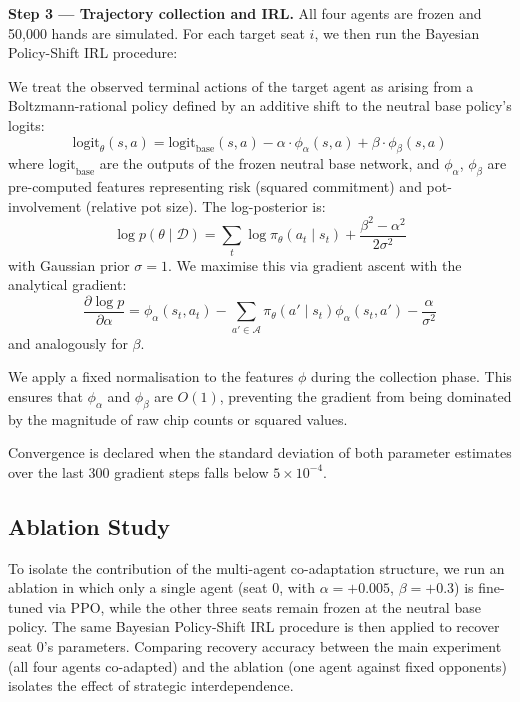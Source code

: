 \documentclass{article}
\begin{document}
\textbf{Step 3 --- Trajectory collection and IRL.} All four agents are frozen and 50,000 hands are simulated. For each target seat $i$, we then run the Bayesian Policy-Shift IRL procedure:
\begin{enumerate}
    We treat the observed terminal actions of the target agent as arising from a Boltzmann-rational policy defined by an additive shift to the neutral base policy's logits:
    \[
    \text{logit}_\theta(s, a) = \text{logit}_{\text{base}}(s, a) - \alpha \cdot \phi_\alpha(s, a) + \beta \cdot \phi_\beta(s, a)
    \]
    where $\text{logit}_{\text{base}}$ are the outputs of the frozen neutral base network, and $\phi_\alpha$, $\phi_\beta$ are pre-computed features representing risk (squared commitment) and pot-involvement (relative pot size). The log-posterior is:
    \[
    \log p(\theta \mid \mathcal{D}) = \sum_t \log \pi_\theta(a_t \mid s_t) + \frac{\beta^2 - \alpha^2}{2\sigma^2}
    \]
    with Gaussian prior $\sigma = 1$. We maximise this via gradient ascent with the analytical gradient:
    \[
    \frac{\partial \log p}{\partial \alpha} = \phi_\alpha(s_t, a_t) - \sum_{a' \in \mathcal{A}} \pi_\theta(a' \mid s_t) \phi_\alpha(s_t, a') - \frac{\alpha}{\sigma^2}
    \]
    and analogously for $\beta$.

    We apply a fixed normalisation to the features $\phi$ during the collection phase. This ensures that $\phi_\alpha$ and $\phi_\beta$ are $O(1)$, preventing the gradient from being dominated by the magnitude of raw chip counts or squared values.
\end{enumerate}
Convergence is declared when the standard deviation of both parameter estimates over the last 300 gradient steps falls below $5 \times 10^{-4}$.

\subsection{Ablation Study}

To isolate the contribution of the multi-agent co-adaptation structure, we run an ablation in which only a single agent (seat 0, with $\alpha = +0.005$, $\beta = +0.3$) is fine-tuned via PPO, while the other three seats remain frozen at the neutral base policy. The same  Bayesian Policy-Shift IRL  procedure is then applied to recover seat 0's parameters. Comparing recovery accuracy between the main experiment (all four agents co-adapted) and the ablation (one agent against fixed opponents) isolates the effect of strategic interdependence.
\end{document}
